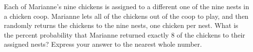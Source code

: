 Each of Marianne's nine chickens is assigned to a different one of the nine nests in a chicken coop. Marianne lets all of the chickens out of the coop to play, and then randomly returns the chickens to the nine nests, one chicken per nest. What is the percent probability that Marianne returned exactly $8$ of the chickens to their assigned nests? Express your answer to the nearest whole number.
